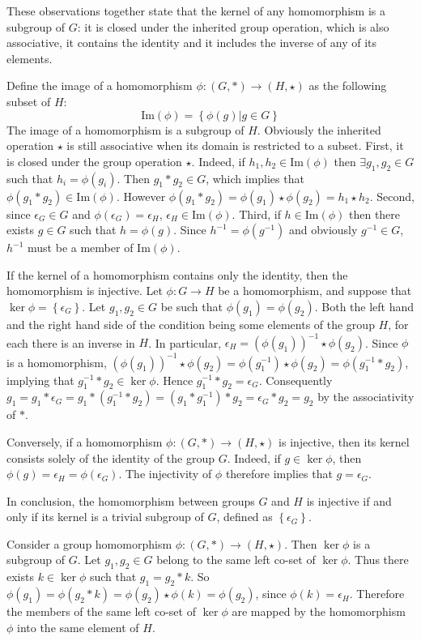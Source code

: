 \documentclass[a4paper]{article}
\newcommand{\obj}[1]{\left\{{#1}\right\}}
\newcommand{\brac}[1]{{\left({#1}\right)}}
\newcommand{\im}[1]{\ensuremath{\text{Im}\brac{ #1 }}}
\begin{document}
These observations together state that the kernel of any homomorphism is a subgroup of $G$: it is closed under the inherited group operation, which is also associative, it contains the identity and it includes the inverse of any of its elements.

Define the image of a homomorphism $\phi:\brac{G, \ast}\to \brac{H, \star}$ as the following subset of $H$:\[\im{\phi}=\obj{\phi(g)\vert g\in G}\]The image of a homomorphism is a subgroup of $H$. Obviously the inherited operation $\star$ is still associative when its domain is restricted to a subset.
First, it is closed under the group operation $\star$. Indeed, if $h_1, h_2\in \im{\phi}$ then $\exists{g_1, g_2\in G}$ such that $h_i=\phi(g_i)$. Then $g_1\ast g_2\in G$, which implies that $\phi(g_1\ast g_2)\in \im{\phi}$. However $\phi(g_1\ast g_2) = \phi(g_1)\star \phi(g_2) = h_1\star h_2$.
Second, since $\epsilon_G\in G$ and $\phi(\epsilon_G)=\epsilon_H$, $\epsilon_H\in \im{\phi}$.
Third, if $h\in \im{\phi}$ then there exists $g\in G$ such that $h=\phi(g)$. Since $h^{-1} = \phi(g^{-1})$ and obviously $g^{-1}\in G$, $h^{-1}$ must be a member of $\im{\phi}$.

If the kernel of a homomorphism contains only the identity, then the homomorphism is injective. Let $\phi:G\to H$ be a homomorphism, and suppose that $\ker{\phi}=\obj{\epsilon_G}$. Let $g_1, g_2\in G$ be such that $\phi(g_1)=\phi(g_2)$. Both the left hand and the right hand side of the condition being some elements of the group $H$, for each there is an inverse in $H$. In particular, $\epsilon_H = \brac{\phi(g_1)}^{-1}\star \phi(g_2)$. Since $\phi$ is a homomorphism, $\brac{\phi(g_1)}^{-1}\star \phi(g_2) = \phi(g_1^{-1})\star \phi(g_2) = \phi(g_1^{-1}\ast g_2)$, implying that $g_1^{-1}\ast g_2\in \ker{\phi}$. Hence $g_1^{-1}\ast g_2=\epsilon_G$. Consequently $g_1 = g_1\ast \epsilon_G = g_1\ast \brac{g_1^{-1}\ast g_2} = \brac{g_1\ast g_1^{-1}}\ast g_2 = \epsilon_G\ast g_2 = g_2$ by the associativity of $\ast$.

Conversely, if a homomorphism $\phi:\brac{G, \ast}\to \brac{H, \star}$ is injective, then its kernel consists solely of the identity of the group $G$. Indeed, if $g\in \ker{\phi}$, then $\phi(g)=\epsilon_H=\phi(\epsilon_G)$. The injectivity of $\phi$ therefore implies that $g=\epsilon_G$.

In conclusion, the homomorphism between groups $G$ and $H$ is injective if and only if its kernel is a trivial subgroup of $G$, defined as $\obj{\epsilon_G}$.

Consider a group homomorphism $\phi:\brac{G, \ast}\to \brac{H, \star}$. Then $\ker{\phi}$ is a subgroup of $G$. Let $g_1, g_2\in G$ belong to the same left co-set of $\ker{\phi}$. Thus there exists $k\in \ker{\phi}$ such that $g_1=g_2\ast k$. So $\phi(g_1)=\phi(g_2\ast k)=\phi(g_2)\star \phi(k) = \phi(g_2)$, since $\phi(k)=\epsilon_H$. Therefore the members of the same left co-set of $\ker{\phi}$ are mapped by the homomorphism $\phi$ into the same element of $H$.
\end{document}
